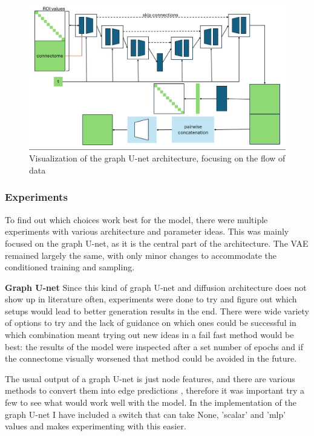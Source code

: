 	\begin{figure}[!h]
		\centering
		\includegraphics[width=\textwidth]{figures/own_gunet.png}
		\caption{Visualization of the graph U-net architecture, focusing on the flow of data}
	\end{figure}
	
	
	\subsubsection{Experiments}
	
	To find out which choices work best for the model, there were multiple experiments with various architecture and parameter ideas. This was mainly focused on the graph U-net, as it is the central part of the architecture. The VAE remained largely the same, with only minor changes to accommodate the conditioned training and sampling.

	\textbf{Graph U-net} Since this kind of graph U-net and diffusion architecture does not show up in literature often, experiments were done to try and figure out which setups would lead to better generation results in the end. There were wide variety of options to try and the lack of guidance on which ones could be successful in which combination meant trying out new ideas in a fail fast method would be best: the results of the model were inspected after a set number of epochs and if the connectome visually worsened that method could be avoided in the future.
	
	The usual output of a graph U-net is just node features, and there are various methods to convert them into edge predictions \cite{li2023evaluating}, therefore it was important try a few to see what would work well with the model. In the implementation of the graph U-net I have included a switch that can take None, ’scalar’ and ’mlp’ values and makes experimenting with this easier. 
	
